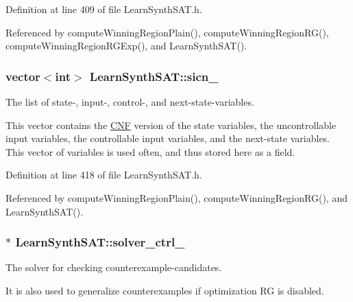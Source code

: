 Definition at line 409 of file Learn\-Synth\-S\-A\-T.\-h.



Referenced by compute\-Winning\-Region\-Plain(), compute\-Winning\-Region\-R\-G(), compute\-Winning\-Region\-R\-G\-Exp(), and Learn\-Synth\-S\-A\-T().

\hypertarget{classLearnSynthSAT_a2eb9ea7dbeb1eb04011e02a16fe2917d}{
\subsubsection[{sicn\-\_\-}]{\setlength{\rightskip}{0pt plus 5cm}vector$<$int$>$ Learn\-Synth\-S\-A\-T\-::sicn\-\_\-\hspace{0.3cm}{\ttfamily [protected]}}}\label{classLearnSynthSAT_a2eb9ea7dbeb1eb04011e02a16fe2917d}


The list of state-\/, input-\/, control-\/, and next-\/state-\/variables. 

This vector contains the \hyperlink{classCNF}{C\-N\-F} version of the state variables, the uncontrollable input variables, the controllable input variables, and the next-\/state variables. This vector of variables is used often, and thus stored here as a field. 

Definition at line 418 of file Learn\-Synth\-S\-A\-T.\-h.



Referenced by compute\-Winning\-Region\-Plain(), compute\-Winning\-Region\-R\-G(), and Learn\-Synth\-S\-A\-T().

\hypertarget{classLearnSynthSAT_abb28d64291205442f1df055049ef0195}{
\subsubsection[{solver\-\_\-ctrl\-\_\-}]{$\ast$ Learn\-Synth\-S\-A\-T\-::solver\-\_\-ctrl\-\_\-\hspace{0.3cm}{\ttfamily [protected]}}}\label{classLearnSynthSAT_abb28d64291205442f1df055049ef0195}


The solver for checking counterexample-\/candidates. 

It is also used to generalize counterexamples if optimization R\-G is disabled. 


